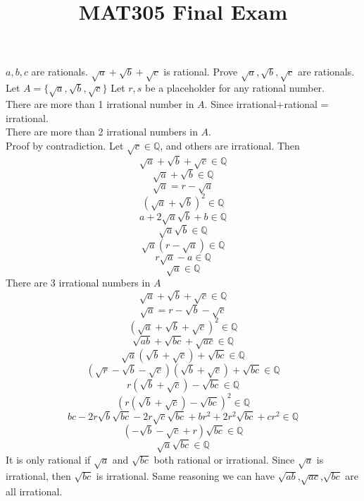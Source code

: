 \documentclass[letter]{article}
\title{MAT305 Final Exam}
\date{}
\newcommand{\Q}{\mathbb{Q}}
\begin{document}
\maketitle
\vspace{-.5in}
$a,b,c$ are rationals. $\sqrt{a}+\sqrt{b}+\sqrt{c}$ is rational. Prove $\sqrt{a},\sqrt{b},\sqrt{c}$ are rationals.
Let $A = \{\sqrt{a},\sqrt{b},\sqrt{c}\}$
Let $r,s$ be a placeholder for any rational number.\\
There are more than 1 irrational number in $A$. Since irrational+rational = irrational.\\
There are more than 2 irrational numbers in $A$. \\
Proof by contradiction. Let $\sqrt{c}\in \Q$, and others are irrational. Then
$$\sqrt{a}+\sqrt{b}+\sqrt{c}\in \Q$$
$$\sqrt{a}+\sqrt{b}\in \Q$$
$$\sqrt{a}= r - \sqrt{a}$$
$$(\sqrt{a}+\sqrt{b})^2\in \Q$$
$$a+2\sqrt{a}\sqrt{b}+b\in \Q$$
$$\sqrt{a}\sqrt{b}\in \Q$$
$$\sqrt{a}(r-\sqrt{a})\in \Q$$
$$r\sqrt{a}-a\in \Q$$
$$\sqrt{a}\in \Q$$
There are 3 irrational numbers in $A$
$$\sqrt{a}+\sqrt{b}+\sqrt{c}\in \Q$$
$$\sqrt{a}=r - \sqrt{b}-\sqrt{c}$$
$$(\sqrt{a}+\sqrt{b}+\sqrt{c})^2\in \Q$$
$$\sqrt{ab}+\sqrt{bc}+\sqrt{ac}\in \Q$$
$$\sqrt{a}(\sqrt{b}+\sqrt{c})+\sqrt{bc} \in \Q$$
$$(\sqrt{r}-\sqrt{b}-\sqrt{c})(\sqrt{b}+\sqrt{c})+\sqrt{bc} \in \Q$$
$$r(\sqrt{b}+\sqrt{c})-\sqrt{bc} \in \Q$$
$$(r(\sqrt{b}+\sqrt{c})-\sqrt{bc})^2 \in \Q$$
$$b c - 2r \sqrt{b} \sqrt{b c}- 2r \sqrt{c} \sqrt{b c} + b r^2 + 
 2r^2 \sqrt{bc} + c r^2 \in \Q$$
$$(-\sqrt{b}-\sqrt{c}+r) \sqrt{b c}\in \Q$$
$$\sqrt{a}\sqrt{bc}\in \Q$$
It is only rational if $\sqrt{a}$ and $\sqrt{bc}$ both rational or irrational. Since $\sqrt{a}$ is irrational, then $\sqrt{bc}$ is irrational. Same reasoning we can have $\sqrt{ab}$,$\sqrt{ac}$,$\sqrt{bc}$ are all irrational.
\end{document}

